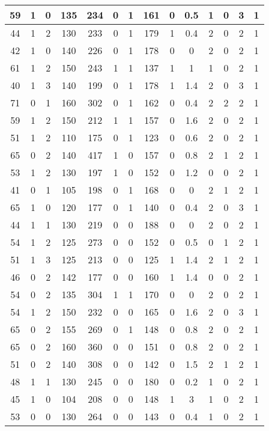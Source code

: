 \documentclass{article}
\begin{document}
\begin{longtable}{|c|c|c|c|c|c|c|c|c|c|c|c|c|c|}
59 & 1 & 0 & 135 & 234 & 0 & 1 & 161 & 0 & 0.5 & 1 & 0 & 3 & 1\\ \hline
44 & 1 & 2 & 130 & 233 & 0 & 1 & 179 & 1 & 0.4 & 2 & 0 & 2 & 1\\ \hline
42 & 1 & 0 & 140 & 226 & 0 & 1 & 178 & 0 & 0 & 2 & 0 & 2 & 1\\ \hline
61 & 1 & 2 & 150 & 243 & 1 & 1 & 137 & 1 & 1 & 1 & 0 & 2 & 1\\ \hline
40 & 1 & 3 & 140 & 199 & 0 & 1 & 178 & 1 & 1.4 & 2 & 0 & 3 & 1\\ \hline
71 & 0 & 1 & 160 & 302 & 0 & 1 & 162 & 0 & 0.4 & 2 & 2 & 2 & 1\\ \hline
59 & 1 & 2 & 150 & 212 & 1 & 1 & 157 & 0 & 1.6 & 2 & 0 & 2 & 1\\ \hline
51 & 1 & 2 & 110 & 175 & 0 & 1 & 123 & 0 & 0.6 & 2 & 0 & 2 & 1\\ \hline
65 & 0 & 2 & 140 & 417 & 1 & 0 & 157 & 0 & 0.8 & 2 & 1 & 2 & 1\\ \hline
53 & 1 & 2 & 130 & 197 & 1 & 0 & 152 & 0 & 1.2 & 0 & 0 & 2 & 1\\ \hline
41 & 0 & 1 & 105 & 198 & 0 & 1 & 168 & 0 & 0 & 2 & 1 & 2 & 1\\ \hline
65 & 1 & 0 & 120 & 177 & 0 & 1 & 140 & 0 & 0.4 & 2 & 0 & 3 & 1\\ \hline
44 & 1 & 1 & 130 & 219 & 0 & 0 & 188 & 0 & 0 & 2 & 0 & 2 & 1\\ \hline
54 & 1 & 2 & 125 & 273 & 0 & 0 & 152 & 0 & 0.5 & 0 & 1 & 2 & 1\\ \hline
51 & 1 & 3 & 125 & 213 & 0 & 0 & 125 & 1 & 1.4 & 2 & 1 & 2 & 1\\ \hline
46 & 0 & 2 & 142 & 177 & 0 & 0 & 160 & 1 & 1.4 & 0 & 0 & 2 & 1\\ \hline
54 & 0 & 2 & 135 & 304 & 1 & 1 & 170 & 0 & 0 & 2 & 0 & 2 & 1\\ \hline
54 & 1 & 2 & 150 & 232 & 0 & 0 & 165 & 0 & 1.6 & 2 & 0 & 3 & 1\\ \hline
65 & 0 & 2 & 155 & 269 & 0 & 1 & 148 & 0 & 0.8 & 2 & 0 & 2 & 1\\ \hline
65 & 0 & 2 & 160 & 360 & 0 & 0 & 151 & 0 & 0.8 & 2 & 0 & 2 & 1\\ \hline
51 & 0 & 2 & 140 & 308 & 0 & 0 & 142 & 0 & 1.5 & 2 & 1 & 2 & 1\\ \hline
48 & 1 & 1 & 130 & 245 & 0 & 0 & 180 & 0 & 0.2 & 1 & 0 & 2 & 1\\ \hline
45 & 1 & 0 & 104 & 208 & 0 & 0 & 148 & 1 & 3 & 1 & 0 & 2 & 1\\ \hline
53 & 0 & 0 & 130 & 264 & 0 & 0 & 143 & 0 & 0.4 & 1 & 0 & 2 & 1\\ \hline

\end{longtable}
\end{document}
